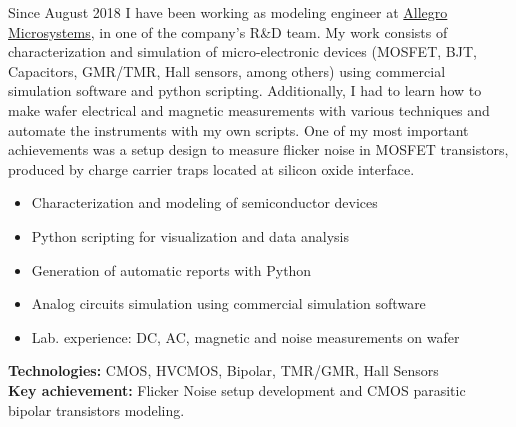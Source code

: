 \documentclass[10pt,a4paper]{altacv}
\begin{document}


Since August 2018 I have been working as modeling engineer at \href{https://www.allegromicro.com/}{Allegro Microsystems}, in one of the company’s R\&D team. My work consists of characterization and simulation of micro-electronic devices (MOSFET, BJT, Capacitors, GMR/TMR, Hall sensors, among others) using commercial simulation software and python scripting. Additionally, I had to learn how to make wafer electrical and magnetic measurements with various techniques and automate the instruments with my own scripts. One of my most important achievements was a setup design to measure flicker noise in MOSFET transistors, produced by charge carrier traps located at silicon oxide interface.

\medskip
{}
\nocite{*}
\justifying
{}
\begin{itemize}
    \item Characterization and modeling of semiconductor devices
    \item Python scripting for visualization and data analysis
    \item Generation of automatic reports with Python
    \item Analog circuits simulation using commercial simulation software
    \item Lab. experience: DC, AC, magnetic and noise measurements on wafer
\end{itemize}

\small{
\textbf{Technologies:} CMOS, HVCMOS, Bipolar, TMR/GMR, Hall Sensors \\
\textbf{Key achievement:} Flicker Noise setup development and CMOS parasitic bipolar transistors modeling.
}\\\\
 \\
\end{document}
